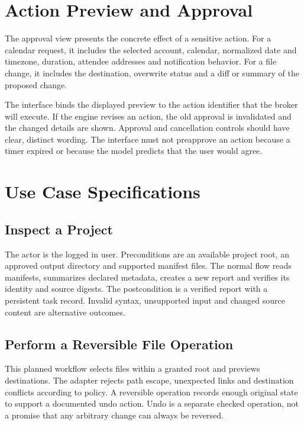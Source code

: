 \section{Action Preview and Approval}
The approval view presents the concrete effect of a sensitive action. For a calendar request, it includes the selected account, calendar, normalized date and timezone, duration, attendee addresses and notification behavior. For a file change, it includes the destination, overwrite status and a diff or summary of the proposed change.


The interface binds the displayed preview to the action identifier that the broker will execute. If the engine revises an action, the old approval is invalidated and the changed details are shown. Approval and cancellation controls should have clear, distinct wording. The interface must not preapprove an action because a timer expired or because the model predicts that the user would agree.

\section{Use Case Specifications}
\subsection{Inspect a Project}
The actor is the logged in user. Preconditions are an available project root, an approved output directory and supported manifest files. The normal flow reads manifests, summarizes declared metadata, creates a new report and verifies its identity and source digests. The postcondition is a verified report with a persistent task record. Invalid syntax, unsupported input and changed source content are alternative outcomes.

\subsection{Perform a Reversible File Operation}
This planned workflow selects files within a granted root and previews destinations. The adapter rejects path escape, unexpected links and destination conflicts according to policy. A reversible operation records enough original state to support a documented undo action. Undo is a separate checked operation, not a promise that any arbitrary change can always be reversed.

